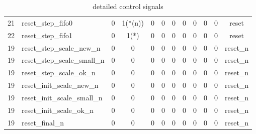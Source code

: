 \documentclass[mscthesis]{usiinfthesis}
\begin{document}
\begin{table}
\begin{center}
\begin{tabular}{|c|l|*{10}{c|}}
    21   & reset\_step\_fifo0          & 0    & 1(*(n))& 0    & 0          & 0      & 0      & 0    & 0    & 0     & reset       \\
    22   & reset\_step\_fifo1          & 0    & 1(*)   & 0    & 0          & 0      & 0      & 0    & 0    & 0     & reset       \\
    19   & reset\_step\_scale\_new\_n  & 0    & 0      & 0    & 0          & 0      & 0      & 0    & 0    & 0     & reset\_n    \\
    19   & reset\_step\_scale\_small\_n& 0    & 0      & 0    & 0          & 0      & 0      & 0    & 0    & 0     & reset\_n    \\
    19   & reset\_step\_scale\_ok\_n   & 0    & 0      & 0    & 0          & 0      & 0      & 0    & 0    & 0     & reset\_n    \\
    19   & reset\_init\_scale\_new\_n  & 0    & 0      & 0    & 0          & 0      & 0      & 0    & 0    & 0     & reset\_n    \\
    19   & reset\_init\_scale\_small\_n& 0    & 0      & 0    & 0          & 0      & 0      & 0    & 0    & 0     & reset\_n    \\
    19   & reset\_init\_scale\_ok\_n   & 0    & 0      & 0    & 0          & 0      & 0      & 0    & 0    & 0     & reset\_n    \\
    19   & reset\_final\_n             & 0    & 0      & 0    & 0          & 0      & 0      & 0    & 0    & 0     & reset\_n    \\
    \hline
    \end{tabular}
    \end{center}
    \caption{detailed control signals}
    \label{tab:ctrl_detailed}
\end{table}

\backmatter


%
%
%
%
%

%

\printglossaries

\end{document}
